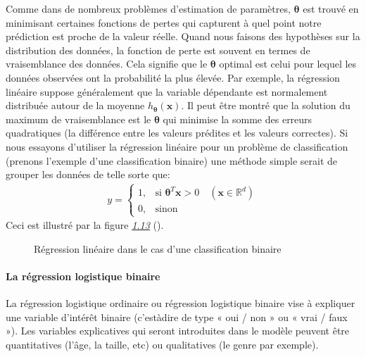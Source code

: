 \documentclass[letterpaper,11pt,english]{sphinxmanual}
\begin{document}
\sphinxAtStartPar
Comme dans de nombreux problèmes d’estimation de paramètres,
\(\boldsymbol{\theta}\) est trouvé en minimisant certaines fonctions
de pertes qui capturent à quel point notre prédiction est proche de la
valeur réelle. Quand nous faisons des hypothèses sur la distribution des
données, la fonction de perte est souvent en termes de vraisemblance des
données. Cela signifie que le \(\boldsymbol{\theta}\) optimal est
celui pour lequel les données observées ont la probabilité la plus
élevée. Par exemple, la régression linéaire suppose généralement que la
variable dépendante est normalement distribuée autour de la moyenne
\(h_{\boldsymbol{\theta}}(\mathbf{x})\). Il peut être montré que la
solution du maximum de vraisemblance est le \(\boldsymbol{\theta}\)
qui minimise la somme des erreurs quadratiques (la différence entre les
valeurs prédites et les valeurs correctes). Si nous essayons d’utiliser
la régression linéaire pour un problème de classification (prenons
l’exemple d’une classification binaire) une méthode simple serait de
grouper les données de telle sorte que:
\begin{equation}\label{equation:chapter3:chapter3:28}
\begin{split}y=
\begin{cases}
1,& \text{si } \boldsymbol{\theta}^{T}\mathbf{x} > 0 \quad (\mathbf{x}\in \mathbb{R}^{d}) \\
0,& \text{sinon}
\end{cases}\end{split}
\end{equation}
\sphinxAtStartPar
Ceci est illustré par la figure {\hyperref[\detokenize{chapter3:Figure1}]{\emph{1.13}}} ().

\begin{figure}[H]
\centering
\capstart

\noindent{}
\caption{Régression linéaire dans le cas d’une classification binaire}\label{\detokenize{chapter3:id14}}\end{figure}


\paragraph{La régression logistique binaire}
\label{\detokenize{chapter3:la-regression-logistique-binaire}}
\sphinxAtStartPar
La régression logistique ordinaire ou régression logistique binaire vise
à expliquer une variable d’intérêt binaire (c’est\sphinxhyphen{}à\sphinxhyphen{}dire de type « oui /
non » ou « vrai / faux »). Les variables explicatives qui seront
introduites dans le modèle peuvent être quantitatives (l’âge, la taille,
etc) ou qualitatives (le genre par exemple).
\end{document}
